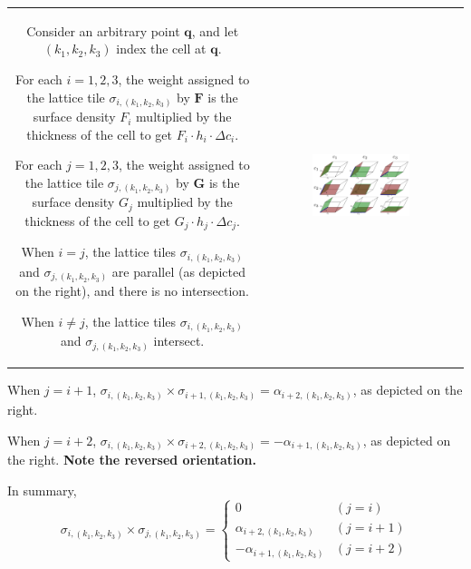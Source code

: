\begin{tabular}{cc}
\parbox{0.5\textwidth}{
Consider an arbitrary point \(\mathbf{q}\), and let \((k_1, k_2, k_3)\) index the cell at \(\mathbf{q}\). 

For each \(i = 1, 2, 3\), the weight assigned to the lattice tile \(\sigma_{i,(k_1,k_2,k_3)}\) by \(\mathbf{F}\) is the surface density \(F_i\) multiplied by the thickness of the cell to get \(F_i \cdot h_i \cdot \Delta c_i\). 

For each \(j = 1, 2, 3\), the weight assigned to the lattice tile \(\sigma_{j,(k_1,k_2,k_3)}\) by \(\mathbf{G}\) is the surface density \(G_j\) multiplied by the thickness of the cell to get \(G_j \cdot h_j \cdot \Delta c_j\). 

When \(i = j\), the lattice tiles \(\sigma_{i, (k_1, k_2, k_3)}\) and \(\sigma_{j, (k_1, k_2, k_3)}\) are parallel (as depicted on the right), and there is no intersection. 

When \(i \neq j\), the lattice tiles \(\sigma_{i, (k_1, k_2, k_3)}\) and \(\sigma_{j, (k_1, k_2, k_3)}\) intersect. 
} & \parbox{0.5\textwidth}{
\includegraphics[width = 0.5\textwidth]{Coordinate_systems/surface_surface_intersection_cell}
}
\end{tabular}

\vspace{1mm}

When \(j = i + 1\), \(\sigma_{i, (k_1, k_2, k_3)} \times \sigma_{i+1, (k_1, k_2, k_3)} = \alpha_{i+2, (k_1, k_2, k_3)}\), as depicted on the right. 

When \(j = i + 2\), \(\sigma_{i, (k_1, k_2, k_3)} \times \sigma_{i+2, (k_1, k_2, k_3)} = -\alpha_{i+1, (k_1, k_2, k_3)}\), as depicted on the right. {\bf Note the reversed orientation.} 

In summary, 
\[\sigma_{i, (k_1,k_2,k_3)} \times \sigma_{j, (k_1,k_2,k_3)} = \left\{\begin{array}{cc} 0 & (j = i) \\ \alpha_{i+2, (k_1, k_2, k_3)} & (j = i+1) \\ -\alpha_{i+1, (k_1, k_2, k_3)} & (j = i+2) \end{array}\right.\]

